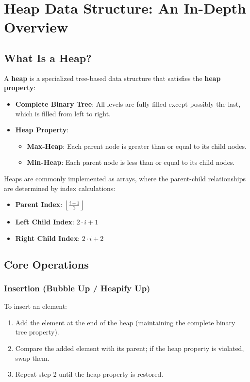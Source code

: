 \section{Heap Data Structure: An In-Depth Overview}

\subsection{What Is a Heap?}

A \textbf{heap} is a specialized tree-based data structure that satisfies the \textbf{heap property}:

\begin{itemize}
    \item \textbf{Complete Binary Tree}: All levels are fully filled except possibly the last, which is filled from left to right.
    \item \textbf{Heap Property}:
    \begin{itemize}
        \item \textbf{Max-Heap}: Each parent node is greater than or equal to its child nodes.
        \item \textbf{Min-Heap}: Each parent node is less than or equal to its child nodes.
    \end{itemize}
\end{itemize}

Heaps are commonly implemented as arrays, where the parent-child relationships are determined by index calculations:
\begin{itemize}
    \item \textbf{Parent Index}: $\left\lfloor \frac{i - 1}{2} \right\rfloor$
    \item \textbf{Left Child Index}: $2 \cdot i + 1$
    \item \textbf{Right Child Index}: $2 \cdot i + 2$
\end{itemize}

\subsection{Core Operations}

\subsubsection{Insertion (Bubble Up / Heapify Up)}

To insert an element:

\begin{enumerate}
    \item Add the element at the end of the heap (maintaining the complete binary tree property).
    \item Compare the added element with its parent; if the heap property is violated, swap them.
    \item Repeat step 2 until the heap property is restored.
\end{enumerate}

